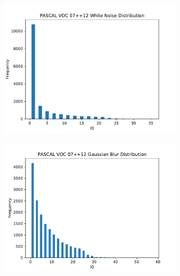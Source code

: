 \begin{figure}[H]
    \centering
    \begin{subfigure}[b]{0.4\textwidth}
        \center
        \includegraphics[width=\textwidth]{Figs/Implementation/WhiteNoisedist.pdf}
        \caption{}\label{fig:dist_wn}
    \end{subfigure}
    \begin{subfigure}[b]{0.4\textwidth}
        \center
        \includegraphics[width=\textwidth]{Figs/Implementation/GaussianBlurdist.pdf}
        \caption{}\label{fig:dist_gb}
    \end{subfigure}
    \begin{subfigure}[b]{0.4\textwidth}
        \center

\end{subfigure}
\end{figure}

